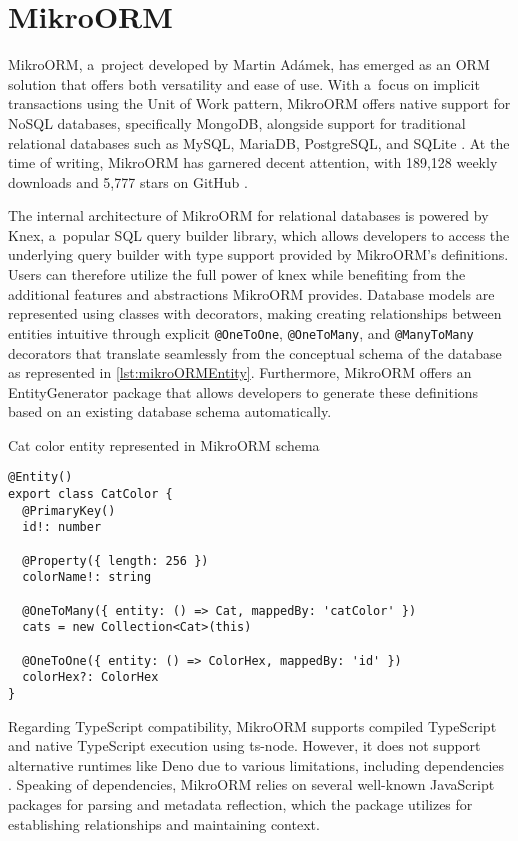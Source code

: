 \section{MikroORM}

MikroORM, a~project developed by Martin Adámek, has emerged as an ORM solution
that offers both versatility and ease of use. With a~focus on implicit
transactions using the Unit of Work pattern, MikroORM offers native support for
NoSQL databases, specifically MongoDB, alongside support for traditional
relational databases such as MySQL, MariaDB, PostgreSQL, and SQLite
\cite{mikroORMWeb}. At the time of writing, MikroORM has garnered decent
attention, with 189,128 weekly downloads and 5,777 stars on GitHub
\cite{mikroORMGitHub} \cite{mikroORMNpm}.

The internal architecture of MikroORM for relational databases is powered by
Knex, a~popular SQL query builder library, which allows developers to access the
underlying query builder with type support provided by MikroORM's definitions.
Users can therefore utilize the full power of knex while benefiting from the
additional features and abstractions MikroORM provides. Database models are
represented using classes with decorators, making creating relationships between
entities intuitive through explicit \texttt{@OneToOne}, \texttt{@OneToMany}, and
\texttt{@ManyToMany} decorators that translate seamlessly from the conceptual
schema of the database as represented in \autoref{lst:mikroORMEntity}.
Furthermore, MikroORM offers an EntityGenerator package that allows developers
to generate these definitions based on an existing database schema
automatically.

\begin{listing}
    \caption{Cat color entity represented in MikroORM schema}
    \label{lst:mikroORMEntity}
    \begin{verbatim}
@Entity()
export class CatColor {
  @PrimaryKey()
  id!: number

  @Property({ length: 256 })
  colorName!: string

  @OneToMany({ entity: () => Cat, mappedBy: 'catColor' })
  cats = new Collection<Cat>(this)

  @OneToOne({ entity: () => ColorHex, mappedBy: 'id' })
  colorHex?: ColorHex
}
    \end{verbatim}
    \vspace{-\baselineskip}
\end{listing}

Regarding TypeScript compatibility, MikroORM supports compiled TypeScript and
native TypeScript execution using ts-node. However, it does not support
alternative runtimes like Deno due to various limitations, including
dependencies \cite{mikroORMDeno}. Speaking of dependencies, MikroORM relies on
several well-known JavaScript packages for parsing and metadata reflection,
which the package utilizes for establishing relationships and maintaining
context.

